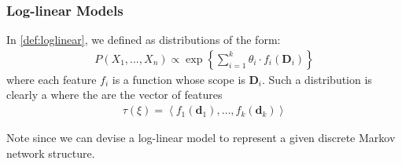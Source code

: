 \documentclass{article}
\begin{document}
\subsubsection{Log-linear Models }
In \cref{def:loglinear}, we defined  as distributions of the form:
\begin{align*}
P\left(X_{1}, \ldots, X_{n}\right) \propto \exp \left\{\sum_{i=1}^{k} \theta_{i} \cdot f_{i}\left(\boldsymbol{D}_{i}\right)\right\}
\end{align*}
where each feature $f_{i}$ is a function whose scope is $\boldsymbol{D}_{i}$. 
Such a distribution is clearly a  where the  are the vector of features
\begin{align*}
\tau(\xi)=\left\langle f_{1}\left(\boldsymbol{d}_{1}\right), \ldots, f_{k}\left(\boldsymbol{d}_{k}\right)\right\rangle
\end{align*}
\begin{rema}
Note  since we can devise a log-linear model to represent a given discrete Markov network structure.
\end{rema}
\end{document}
